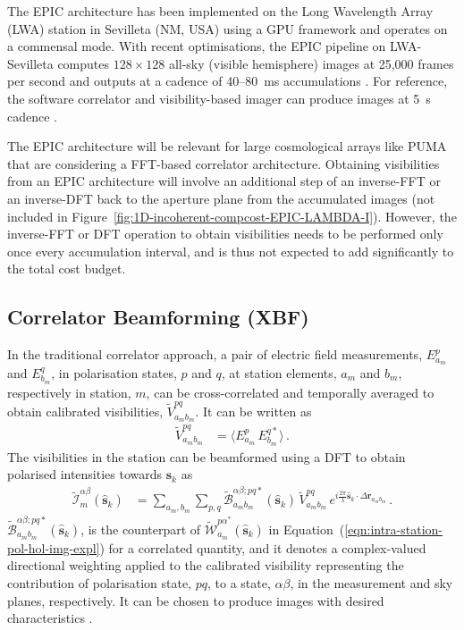 \documentclass[
  journal=pasa,
  manuscript=article-type,
  year=2020,
  volume=37,
]{cup-journal}
\begin{document}
The EPIC architecture has been implemented on the Long Wavelength Array (LWA) station in Sevilleta (NM, USA) \citep{Kent+2019,Kent+2020,Krishnan+2023} using a GPU framework and operates on a commensal mode. With recent optimisations, the EPIC pipeline on LWA-Sevilleta computes $128\times 128$ all-sky (visible hemisphere) images at 25,000 frames per second and outputs at a cadence of 40--80~ms accumulations \citep{Reddy+2024}. For reference, the software correlator and visibility-based imager can produce images at 5~s cadence \citep{Taylor+2012}.

The EPIC architecture will be relevant for large cosmological arrays like PUMA that are considering a FFT-based correlator architecture. Obtaining visibilities from an EPIC architecture will involve an additional step of an inverse-FFT or an inverse-DFT back to the aperture plane from the accumulated images (not included in Figure~\ref{fig:1D-incoherent-compcost-EPIC-LAMBDA-I}). However, the inverse-FFT or DFT operation to obtain visibilities needs to be performed only once every accumulation interval, and is thus not expected to add significantly to the total cost budget.

\subsection{Correlator Beamforming (XBF)}

In the traditional correlator approach, a pair of electric field measurements, $E_{a_m}^p$ and $E_{b_m}^q$, in polarisation states, $p$ and $q$, at station elements, $a_m$ and $b_m$, respectively in station, $m$, can be cross-correlated and temporally averaged to obtain calibrated visibilities, $\widetilde{V}_{a_m b_m}^{pq}$. It can be written as 
\begin{align}
    \widetilde{V}_{a_m b_m}^{pq} &= \bigl\langle E_{a_m}^p \, E_{b_m}^{q*}\bigr\rangle \, . \label{eqn:intra-station-pol-visibilities}
\end{align}
The visibilities in the station can be beamformed using a DFT to obtain polarised intensities towards $\boldsymbol{s}_k$ as
\begin{align}
    \widetilde{\mathcal{I}}_m^{\alpha\beta}(\hat{\boldsymbol{s}}_k) 
    &= \sum_{a_m,b_m} \sum_{p,q} \widetilde{\mathcal{B}}_{a_m b_m}^{\alpha\beta;pq*}(\hat{\boldsymbol{s}}_k) \, \widetilde{V}_{a_m b_m}^{pq} \,  e^{i\frac{2\pi}{\lambda} \hat{\boldsymbol{s}}_k\cdot\Delta\boldsymbol{r}_{a_m b_m}} \, . \label{eqn:intra-station-pol-xbf-img-expl} 
\end{align}
$\widetilde{\mathcal{B}}_{a_m b_m}^{\alpha\beta;pq*}(\hat{\boldsymbol{s}}_k)$, is the counterpart of $\widetilde{\mathcal{W}}_{a_m}^{{p\alpha}^*}(\hat{\boldsymbol{s}}_k)$ in Equation~(\ref{eqn:intra-station-pol-hol-img-expl}) for a correlated quantity, and it denotes a complex-valued directional weighting applied to the calibrated visibility representing the contribution of polarisation state, $pq$, to a state, $\alpha\beta$, in the measurement and sky planes, respectively. It can be chosen to produce images with desired characteristics \citep{Masui+2019}. 
\end{document}
